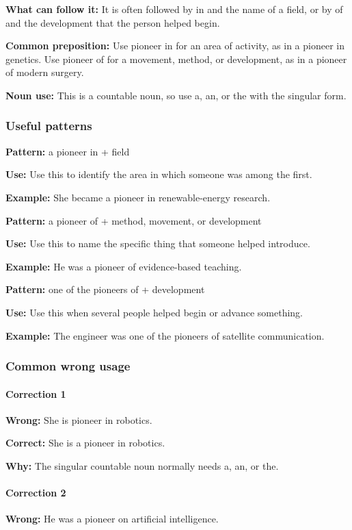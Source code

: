\documentclass[11pt]{article}
\begin{document}
\textbf{What can follow it:} It is often followed by in and the name of a field, or by of and the development that the person helped begin.

\textbf{Common preposition:} Use pioneer in for an area of activity, as in a pioneer in genetics. Use pioneer of for a movement, method, or development, as in a pioneer of modern surgery.

\textbf{Noun use:} This is a countable noun, so use a, an, or the with the singular form.

\subsubsection{Useful patterns}
\textbf{Pattern:} a pioneer in + field

\textbf{Use:} Use this to identify the area in which someone was among the first.

\textbf{Example:} She became a pioneer in renewable-energy research.

\textbf{Pattern:} a pioneer of + method, movement, or development

\textbf{Use:} Use this to name the specific thing that someone helped introduce.

\textbf{Example:} He was a pioneer of evidence-based teaching.

\textbf{Pattern:} one of the pioneers of + development

\textbf{Use:} Use this when several people helped begin or advance something.

\textbf{Example:} The engineer was one of the pioneers of satellite communication.

\subsubsection{Common wrong usage}
\paragraph{Correction 1}
\textbf{Wrong:} She is pioneer in robotics.

\textbf{Correct:} She is a pioneer in robotics.

\textbf{Why:} The singular countable noun normally needs a, an, or the.

\paragraph{Correction 2}
\textbf{Wrong:} He was a pioneer on artificial intelligence.
\end{document}
